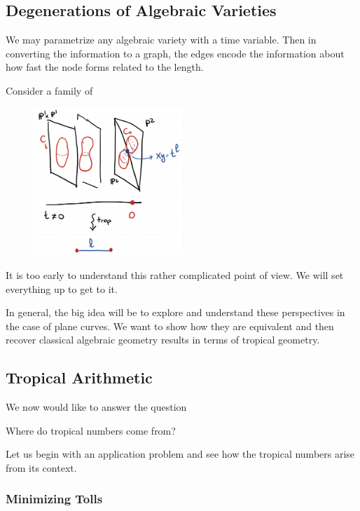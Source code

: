 \documentclass[12pt]{memoir}
\theoremstyle{definition}
\begin{document}
\subsection{Degenerations of Algebraic Varieties}
We may parametrize any algebraic variety with a time variable. Then in converting the information to a graph, the edges encode the information about how fast the node forms related to the length.\par
Consider a family of 
\begin{figure}[h!]
    \centering
    \includegraphics[width=0.5\textwidth]{figs/fig1-1.png}
\end{figure}

It is too early to understand this rather complicated point of view. We will set everything up to get to it.\par 
In general, the big idea will be to explore and understand these perspectives in the case of plane curves. We want to show how they are equivalent and then recover classical algebraic geometry results in terms of tropical geometry.

\subsection{Tropical Arithmetic}%

We now would like to answer the question
\begin{significant}
    Where do tropical numbers come from?
\end{significant}
Let us begin with an application problem and see how the tropical numbers arise from its context.

\subsubsection{Minimizing Tolls}
\end{document}
